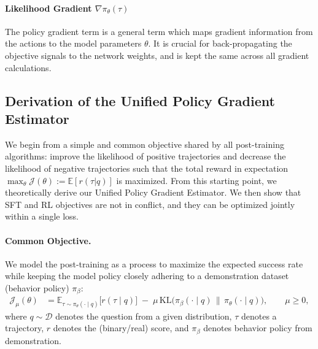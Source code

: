 \documentclass{article} %
\newcommand{\0}{\mathbb{0}}
\newcommand{\1}{\mathbb{1}}
\newcommand{\E}{\mathbb{E}}
\begin{document}
\paragraph{Likelihood Gradient $\nabla \pi_\theta (\tau)$} The policy gradient term is a general term which maps gradient information from the actions to the model parameters $\theta$. It is crucial for back-propagating the objective signals to the network weights, and is kept the same across all gradient calculations. 














\subsection{Derivation of the Unified Policy Gradient Estimator}
\label{sec:shared-common-objective}


We begin from a simple and common objective shared by all post-training algorithms: improve the likelihood of positive trajectories and decrease the likelihood of negative trajectories such that the total reward in expectation $\max_{\theta} \mathcal{J} (\theta) := \mathbb{E} [r(\tau|q)]$ is maximized.
From this starting point, we theoretically derive our Unified Policy Gradient Estimator. We then show that SFT and RL objectives are not in conflict, and they can be optimized jointly within a single loss.

\paragraph{Common Objective.}
We model the post-training as a process to maximize the expected success rate while keeping the model policy closely adhering to a demonstration dataset (behavior policy) $\pi_\beta$:
\begin{equation}
\label{eq:master_obj}
\begin{aligned}
\mathcal{J}_{\mu}(\theta)
&= \E_{\tau\sim \pi_\theta(\cdot\mid q)}\!\big[r(\tau\mid q)\big]
\;-\; \mu\,\mathrm{KL}\!\big(\pi_\beta(\cdot\mid q)\,\|\,\pi_\theta(\cdot\mid q)\big),
\qquad \mu\ge 0,
\end{aligned}
\end{equation}
where $q\!\sim\!\mathcal{D}$ denotes the question from a given distribution, $\tau$ denotes a trajectory, $r$ denotes the (binary/real) score, and $\pi_\beta$ denotes behavior policy from demonstration.
\end{document}
